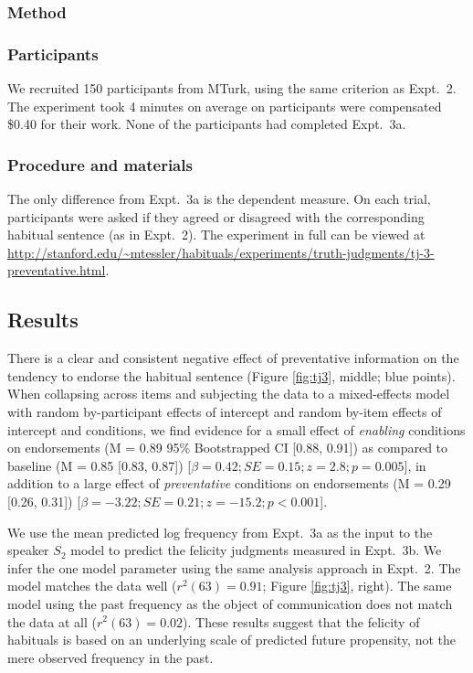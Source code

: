 \documentclass[10pt,letterpaper]{article}
\newcommand{\mht}[1]{\textcolor{DarkOrange}{[mht: #1]}}
\begin{document}
\subsubsection{Method}
\subsubsection{Participants} 

We recruited 150 participants from MTurk, using the same criterion as Expt.~2.
The experiment took 4 minutes on average on participants were compensated \$0.40 for their work.
None of the participants had completed Expt.~3a.

\subsubsection{Procedure and materials}

The only difference from Expt.~3a is the dependent measure. 
On each trial, participants were asked if they agreed or disagreed with the corresponding habitual sentence (as in Expt.~2).
The experiment in full can be viewed at \url{http://stanford.edu/~mtessler/habituals/experiments/truth-judgments/tj-3-preventative.html}.


\subsection{Results}

There is a clear and consistent negative effect of preventative information on the tendency to endorse the habitual sentence (Figure \ref{fig:tj3}, middle; blue points).
When collapsing across items and subjecting the data to a mixed-effects model with random by-participant effects of intercept and random by-item effects of intercept and conditions, we find evidence for a small effect of \emph{enabling} conditions on endorsements (M =  0.89 95\% Bootstrapped CI [0.88, 0.91]) as compared to baseline (M = 0.85 [0.83, 0.87]) [$\beta = 0.42; SE = 0.15; z = 2.8; p = 0.005$], in addition to a large effect of \emph{preventative} conditions on endorsements (M = 0.29 [0.26, 0.31]) [$ \beta = -3.22; SE = 0.21; z = -15.2; p < 0.001$]. 

We use the mean predicted log frequency from Expt.~3a as the input to the speaker $S_2$ model to predict the felicity judgments measured in Expt.~3b.
We infer the one model parameter using the same analysis approach in Expt.~2. 
The model matches the data well ($r^2(63) = 0.91$; Figure \ref{fig:tj3}, right).
The same model using the past frequency as the object of communication does not match the data at all ($r^2(63) = 0.02$).
These results suggest that the felicity of habituals is based on an underlying scale of predicted future propensity, not the mere observed frequency in the past.
\end{document}
